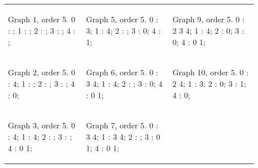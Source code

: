 \begin{tabular}{|p{1.5in} | p{1.5in} | p{1.5in} |}
\begin{minipage}{1.5in}
\begin{output}
Graph 1, order 5.
0 : ;
1 : ;
2 : ;
3 : ;
4 : ;

\end{output}
\end{minipage}
&
\begin{minipage}{1.5in}
\begin{output}
Graph 5, order 5.
0 : 3;
1 : 4;
2 : ;
3 : 0;
4 : 1;

\end{output}
\end{minipage}
& 
\begin{minipage}{1.5in}
\begin{output}
Graph 9, order 5.
0 : 2 3 4;
1 : 4;
2 : 0;
3 : 0;
4 : 0 1;

\end{output}
\end{minipage}
\\
\begin{minipage}{1.5in}
\begin{output}
Graph 2, order 5.
0 : 4;
1 : ;
2 : ;
3 : ;
4 : 0;

\end{output}
\end{minipage}
&
\begin{minipage}{1.5in}
\begin{output}
Graph 6, order 5.
0 : 3 4;
1 : 4;
2 : ;
3 : 0;
4 : 0 1;

\end{output}
\end{minipage}
&
\begin{minipage}{1.5in}
\begin{output}
Graph 10, order 5.
0 : 2 4;
1 : 3;
2 : 0;
3 : 1;
4 : 0;

\end{output}
\end{minipage}
\\
\begin{minipage}{1.5in}
\begin{output}
Graph 3, order 5.
0 : 4;
1 : 4;
2 : ;
3 : ;
4 : 0 1;

\end{output}
\end{minipage}
&
\begin{minipage}{1.5in}
\begin{output}
Graph 7, order 5.
0 : 3 4;
1 : 3 4;
2 : ;
3 : 0 1;
4 : 0 1;


\end{output}
\end{minipage}
\end{tabular}
